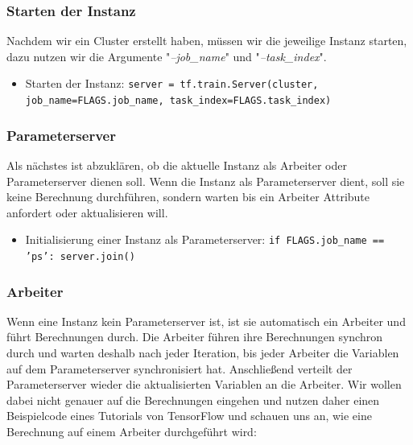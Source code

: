 \vspace{2mm}
\subsubsection{Starten der Instanz}
Nachdem wir ein Cluster erstellt haben, müssen wir die jeweilige Instanz starten, dazu nutzen wir die Argumente "\textit{--job\_name}" und "\textit{--task\_index}".
\begin{itemize}
	\item Starten der Instanz: \newline
		\texttt{server = tf.train.Server(cluster,
				job\_name=FLAGS.job\_name,	
				task\_index=FLAGS.task\_index)}
\end{itemize}

\vspace{2mm}
\subsubsection{Parameterserver}
Als nächstes ist abzuklären, ob die aktuelle Instanz als Arbeiter oder Parameterserver dienen soll. Wenn die Instanz als Parameterserver dient, soll sie keine Berechnung durchführen, sondern warten bis ein Arbeiter Attribute anfordert oder aktualisieren will.
\begin{itemize}
	\item Initialisierung einer Instanz als Parameterserver: \newline
		\texttt{if FLAGS.job\_name == 'ps': 
			server.join()}
\end{itemize}

\vspace{2mm}
\subsubsection{Arbeiter}
Wenn eine Instanz kein Parameterserver ist, ist sie automatisch ein Arbeiter und führt Berechnungen durch. Die Arbeiter führen ihre Berechnungen synchron durch und warten deshalb nach jeder Iteration, bis jeder Arbeiter die Variablen auf dem Parameterserver synchronisiert hat. Anschließend verteilt der Parameterserver wieder die aktualisierten Variablen an die Arbeiter. Wir wollen dabei nicht genauer auf die Berechnungen eingehen und nutzen daher einen Beispielcode eines Tutorials von TensorFlow und schauen uns an, wie eine Berechnung auf einem Arbeiter durchgeführt wird:

